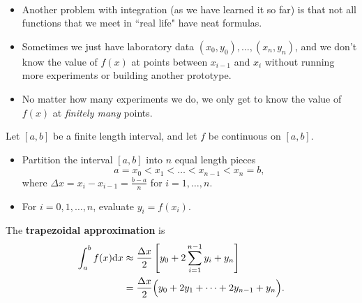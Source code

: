 \begin{remark}\,
\begin{itemize}
\item Another problem with integration (as we have learned it so far) is that not all functions that we meet in ``real life" have neat formulas.
\item Sometimes we just have laboratory data $(x_0, y_0), \dots, (x_n,y_n)$, and we don't know the value of $f(x)$ at points between $x_{i-1}$ and $x_i$ without running more experiments or building another prototype.
\item No matter how many experiments we do, we only get to know the value of $f(x)$ at \textit{finitely many} points.
\end{itemize}
\end{remark}

\begin{definition}
Let $[a,b]$ be a finite length interval, and let $f$ be continuous on $[a,b]$.
\begin{itemize}
\item Partition the interval $[a,b]$ into $n$ equal length pieces
\begin{equation*}
a=x_0 < x_1 <\dots < x_{n-1} < x_n = b,
\end{equation*}
where $\Delta x = x_i - x_{i-1} = \frac{b-a}{n}$ for $i=1,\dots, n$.
\item For $i=0,1,\dots, n$, evaluate $y_i = f(x_i)$.
\end{itemize}
The \textbf{trapezoidal approximation} is
\begin{equation*}
\begin{split}
\int_a^bf(x)\mathrm{d} x &\approx \frac{\Delta x}{2}\left[y_0 + 2\sum_{i=1}^{n-1} y_i + y_n\right]\\
&= \frac{\Delta x}{2}\Big(y_0 + 2y_1 + \dots + 2y_{n-1} + y_n\Big).
\end{split}
\end{equation*}
\end{definition}

